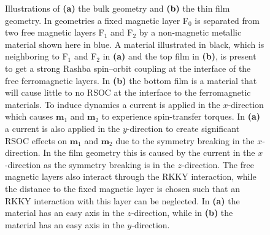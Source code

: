 \begin{figure}[h!]
\begin{subfigure}{.6\textwidth}
\caption{}
\label{fig:FGeometry} 
\end{subfigure}
\caption{Illustrations of \textbf{(a)} the bulk geometry and \textbf{(b)} the thin film geometry. In geometries a fixed magnetic layer F$_0$ is separated from two free magnetic layers F$_1$ and F$_2$ by a non-magnetic metallic material shown here in blue. A material illustrated in black, which is neighboring to F$_1$ and F$_2$ in \textbf{(a)} and the top film in \textbf{(b)}, is present to get a strong Rashba spin--orbit coupling at the interface of the free ferromagnetic layers. In \textbf{(b)} the bottom film is a material that will cause little to no RSOC at the interface to the ferromagnetic materials. To induce dynamics a current is applied in the $x$-direction which causes $\mathbold{m}_1$ and $\mathbold{m}_2$ to experience spin-transfer torques. In \textbf{(a)} a current is also applied in the $y$-direction to create significant RSOC effects on $\mathbold{m}_1$ and $\mathbold{m}_2$ due to the symmetry breaking in the $x$-direction. In the film geometry this is caused by the current in the $x$-direction as the symmetry breaking is in the $z$-direction. The free magnetic layers also interact through the RKKY interaction, while the distance to the fixed magnetic layer is chosen such that an RKKY interaction with this layer can be neglected. In \textbf{(a)} the material has an easy axis in the $z$-direction, while in \textbf{(b)} the material has an easy axis in the $y$-direction.}
\label{fig:Geometries}
\end{figure}

